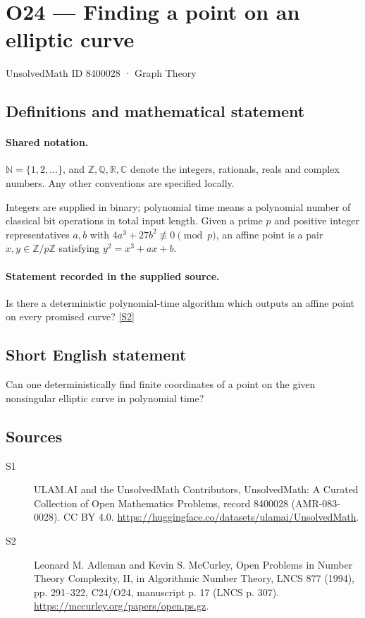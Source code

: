 \documentclass[11pt]{article}
\newcommand{\sref}[2]{\hyperlink{source:#1:#2}{[S#2]}}
\begin{document}
\setcounter{section}{8400027}
\section{O24 — Finding a point on an elliptic curve}\label{8400028}
{\small\sffamily UnsolvedMath ID 8400028 · Graph Theory}
\subsection{Definitions and mathematical statement}

\paragraph{Shared notation.}$\mathbb N=\{1,2,\ldots\}$, and $\mathbb Z,\mathbb Q,\mathbb R,\mathbb C$ denote the integers, rationals, reals and complex numbers. Any other conventions are specified locally.


Integers are supplied in binary; polynomial time means a polynomial number of classical bit operations in total input length. Given a prime $p$ and positive integer representatives $a,b$ with $4a^3+27b^2\not\equiv0\pmod p$, an affine point is a pair $x,y\in\mathbb Z/p\mathbb Z$ satisfying $y^2=x^3+ax+b$.
\paragraph{Statement recorded in the supplied source.}
Is there a deterministic polynomial-time algorithm which outputs an affine point on every promised curve? \sref{8400028}{2}
\subsection{Short English statement}
Can one deterministically find finite coordinates of a point on the given nonsingular elliptic curve in polynomial time?
\subsection{Sources}
\begin{description}
\item[\hypertarget{source:8400028:1}{S1}] ULAM.AI and the UnsolvedMath Contributors, UnsolvedMath: A Curated Collection of Open Mathematics Problems, record 8400028 (AMR-083-0028). CC BY 4.0. \url{https://huggingface.co/datasets/ulamai/UnsolvedMath}.
\item[\hypertarget{source:8400028:2}{S2}] Leonard M. Adleman and Kevin S. McCurley, Open Problems in Number Theory Complexity, II, in Algorithmic Number Theory, LNCS 877 (1994), pp. 291--322, C24/O24, manuscript p. 17 (LNCS p. 307). \url{https://mccurley.org/papers/open.ps.gz}.
\end{description}
\label{end:8400028}
\end{document}
